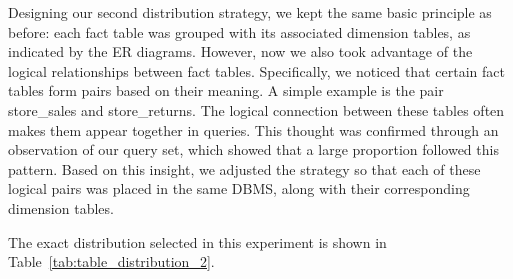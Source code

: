 \documentclass[conference]{IEEEtran}
\begin{document}
Designing our second distribution strategy, we kept the same basic principle as before: each fact table was grouped with its associated dimension tables, as indicated by the ER diagrams. However, now we also took advantage of the logical relationships between fact tables. Specifically, we noticed that certain fact tables form pairs based on their meaning. A simple example is the pair store\_sales and store\_returns. The logical connection between these tables often makes them appear together in queries. This thought was confirmed through an observation of our query set, which showed that a large proportion followed this pattern. Based on this insight, we adjusted the strategy so that each of these logical pairs was placed in the same DBMS, along with their corresponding dimension tables.

The exact distribution selected in this experiment is shown in Table~\ref{tab:table_distribution_2}.
\end{document}
